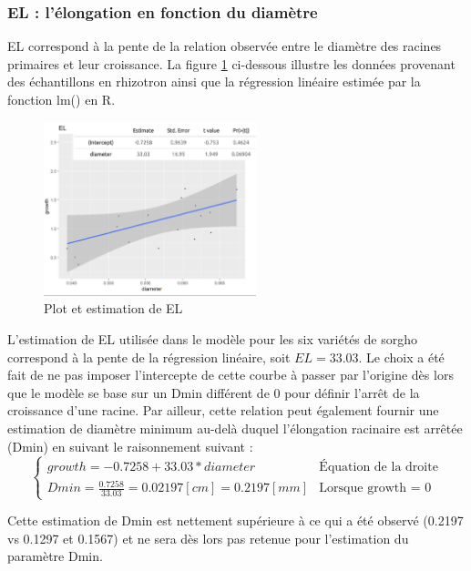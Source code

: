 \subsubsection{EL : l'élongation en fonction du diamètre}

EL correspond à la pente de la relation observée entre le diamètre des racines primaires et leur croissance.
La figure \ref{fig:EL} ci-dessous illustre les données provenant des échantillons en rhizotron ainsi que la régression linéaire estimée par la fonction lm() en R.
\newpage

\begin{figure}[ht]
\centering
\includegraphics[width=0.55\textwidth]{Image/EL.png}
\caption{Plot et estimation de EL}
\label{fig:EL}
\end{figure}

L'estimation de EL utilisée dans le modèle pour les six variétés de sorgho correspond à la pente de la régression linéaire, soit $EL= 33.03$.
Le choix a été fait de ne pas imposer l'intercepte de cette courbe à passer par l'origine dès lors que le modèle se base sur un Dmin différent de 0 pour définir l'arrêt de la croissance d'une racine.
Par ailleur, cette relation peut également fournir une estimation de diamètre minimum au-delà duquel l'élongation racinaire est arrêtée (Dmin) en suivant le raisonnement suivant :
\begin{equation}
    \begin{cases}
        growth = -0.7258 + 33.03*diameter & \text{Équation de la droite} \\
        Dmin = \frac{0.7258}{33.03} = 0.02197 [cm] = 0.2197 [mm] & \text{Lorsque growth = 0}
    \end{cases}
\end{equation}

Cette estimation de Dmin est nettement supérieure à ce qui a été observé (0.2197 vs 0.1297 et 0.1567) et ne sera dès lors pas retenue pour l'estimation du paramètre Dmin.

